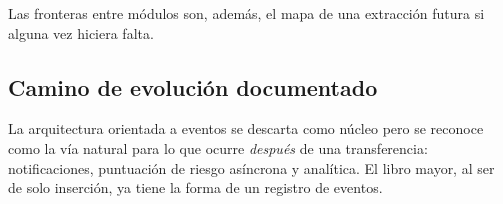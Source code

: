 Las fronteras entre módulos son, además, el mapa de una extracción futura si
alguna vez hiciera falta.

\subsection{Camino de evolución documentado}

La arquitectura orientada a eventos se descarta como núcleo pero se reconoce
como la vía natural para lo que ocurre \emph{después} de una transferencia:
notificaciones, puntuación de riesgo asíncrona y analítica. El libro mayor,
al ser de solo inserción, ya tiene la forma de un registro de eventos.
